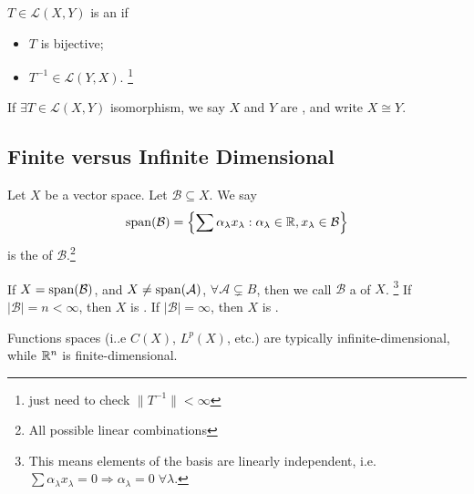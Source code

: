 \begin{defn}[isomorphism]
    $T \in \mathcal{L}(X, Y)$ is an  if 
    \begin{itemize}
        \item $T$ is bijective;
        \item $T^{-1} \in \mathcal{L}(Y, X)$. \footnote{just need to check $\| T^{-1} \| < \infty$ }
    \end{itemize}
    If $\exists T\in \mathcal{L}(X, Y)$ isomorphism, we say $X$ and $Y$ are , and write $X \cong Y$.   
\end{defn}

\subsection{Finite versus Infinite Dimensional}

\begin{defn}
    Let $X$ be a vector space. Let $\mathcal{B} \subseteq X$. We say
    \[
        \operatorname{span}(\mathcal{B}) = \left\{ \sum \alpha_\lambda x_\lambda : \alpha_\lambda \in \mathbb{R}, 
        x_\lambda \in \mathcal{B}  \right\}
    \] 
    is the  of $\mathcal{B}$.\footnote{All possible linear combinations}

    If $X = \operatorname{span}(\mathcal{B})$, and $X \neq \operatorname{span}(\mathcal{A})$, $\forall \mathcal{A} \subsetneq B$,
    then we call $\mathcal{B}$ a  of $X$. \footnote{
        This means elements of the basis are linearly independent, i.e. $\sum \alpha_\lambda 
        x_\lambda = 0 \Rightarrow \alpha_\lambda = 0 \; \forall \lambda$.
    }    
    If $|\mathcal{B}| = n < \infty$, then $X$ is .  
    If $|\mathcal{B}| = \infty$, then $X$ is .  
\end{defn}
\begin{rem}
    Functions spaces (i..e $C(X)$, $L^p(X)$, etc.) are typically infinite-dimensional, 
    while $\mathbb{R}^n$ is finite-dimensional.
\end{rem}

